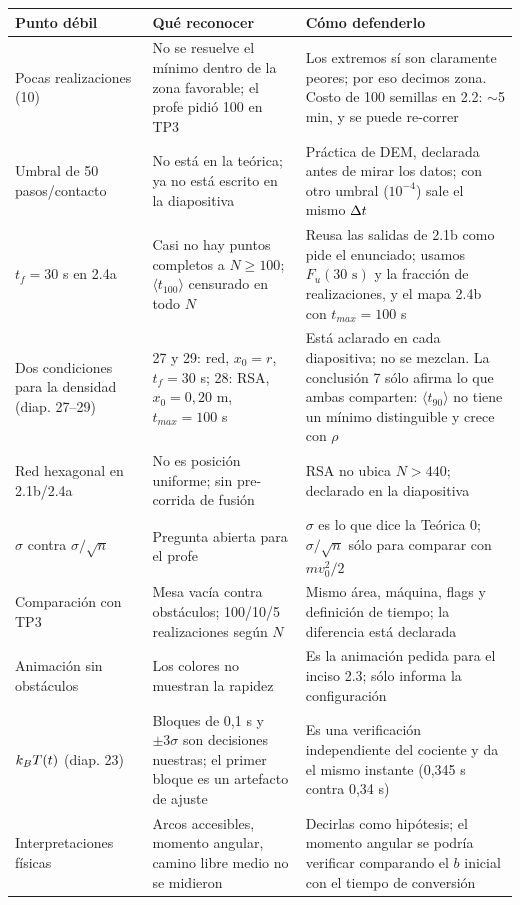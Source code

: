 \documentclass[10.5pt,a4paper]{article}
\begin{document}
\begin{center}\small
\begin{tabular}{@{}p{3.3cm}p{5.4cm}p{7.2cm}@{}}
\toprule
Punto débil & Qué reconocer & Cómo defenderlo \\ \midrule
Pocas realizaciones (10) & No se resuelve el mínimo dentro de la zona favorable; el profe pidió 100 en TP3 & Los extremos sí son claramente peores; por eso decimos zona. Costo de 100 semillas en 2.2: $\sim$5 min, y se puede re-correr \\
Umbral de 50 pasos/contacto & No está en la teórica; ya no está escrito en la diapositiva & Práctica de DEM, declarada antes de mirar los datos; con otro umbral ($10^{-4}$) sale el mismo $\Delta t$ \\
$t_f=30$ s en 2.4a & Casi no hay puntos completos a $N\ge100$; $\langle t_{100}\rangle$ censurado en todo $N$ & Reusa las salidas de 2.1b como pide el enunciado; usamos $F_u(30\text{ s})$ y la fracción de realizaciones, y el mapa 2.4b con $t_{max}=100$ s \\
Dos condiciones para la densidad (diap. 27--29) & 27 y 29: red, $x_0=r$, $t_f=30$ s; 28: RSA, $x_0=0{,}20$ m, $t_{max}=100$ s & Está aclarado en cada diapositiva; no se mezclan. La conclusión 7 sólo afirma lo que ambas comparten: $\langle t_{90}\rangle$ no tiene un mínimo distinguible y crece con $\rho$ \\
Red hexagonal en 2.1b/2.4a & No es posición uniforme; sin pre-corrida de fusión & RSA no ubica $N>440$; declarado en la diapositiva \\
$\sigma$ contra $\sigma/\sqrt n$ & Pregunta abierta para el profe & $\sigma$ es lo que dice la Teórica 0; $\sigma/\sqrt n$ sólo para comparar con $mv_0^2/2$ \\
Comparación con TP3 & Mesa vacía contra obstáculos; 100/10/5 realizaciones según $N$ & Mismo área, máquina, flags y definición de tiempo; la diferencia está declarada \\
Animación sin obstáculos & Los colores no muestran la rapidez & Es la animación pedida para el inciso 2.3; sólo informa la configuración \\
$k_BT(t)$ (diap. 23) & Bloques de 0,1 s y $\pm3\sigma$ son decisiones nuestras; el primer bloque es un artefacto de ajuste & Es una verificación independiente del cociente y da el mismo instante (0,345 s contra 0,34 s) \\
Interpretaciones físicas & Arcos accesibles, momento angular, camino libre medio no se midieron & Decirlas como hipótesis; el momento angular se podría verificar comparando el $b$ inicial con el tiempo de conversión \\ \bottomrule
\end{tabular}
\end{center}
\end{document}
